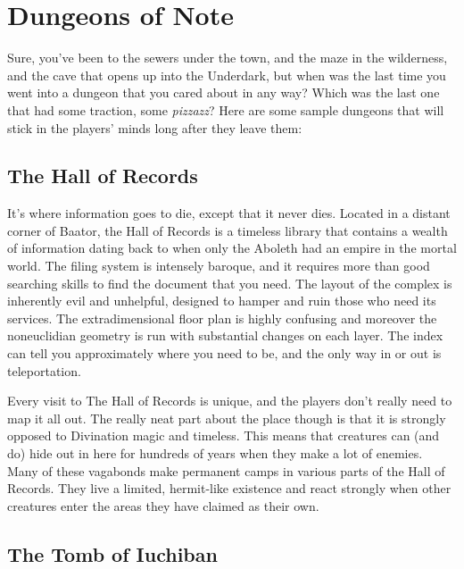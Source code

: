 
\section{Dungeons of Note}

Sure, you've been to the sewers under the town, and the maze in the wilderness, and the cave that opens up into the Underdark, but when was the last time you went into a dungeon that you cared about in any way? Which was the last one that had some traction, some \emph{pizzazz}? Here are some sample dungeons that will stick in the players' minds long after they leave them:

\subsection{The Hall of Records}

It's where information goes to die, except that it never dies. Located in a distant corner of Baator, the Hall of Records is a timeless library that contains a wealth of information dating back to when only the Aboleth had an empire in the mortal world. The filing system is intensely baroque, and it requires more than good searching skills to find the document that you need. The layout of the complex is inherently evil and unhelpful, designed to hamper and ruin those who need its services. The extradimensional floor plan is highly confusing and moreover the noneuclidian geometry is run with substantial changes on each layer. The index can tell you approximately where you need to be, and the only way in or out is teleportation.

Every visit to The Hall of Records is unique, and the players don't really need to map it all out. The really neat part about the place though is that it is strongly opposed to Divination magic and timeless. This means that creatures can (and do) hide out in here for hundreds of years when they make a lot of enemies. Many of these vagabonds make permanent camps in various parts of the Hall of Records. They live a limited, hermit-like existence and react strongly when other creatures enter the areas they have claimed as their own.

\subsection{The Tomb of Iuchiban}

